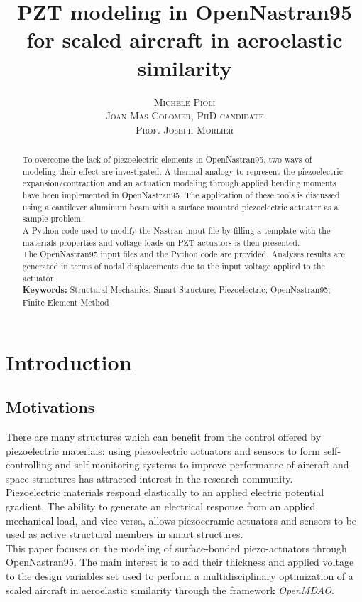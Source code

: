\documentclass[twocolumn,a4paper,10pt,english]{article}
\title{\textbf{\sc PZT modeling in OpenNastran95 for scaled aircraft in aeroelastic similarity\vspace{-0.5cm}}}
\author{
	\textsc{Michele Pioli}\vspace{-0.5cm}\\
	\textsc{Joan Mas Colomer, PhD candidate}\vspace{-0.5cm}\\
	\textsc{Prof. Joseph Morlier}
}
\date{}
\begin{document}
\thispagestyle{plain}

\maketitle


\begin{abstract}
    To overcome the lack of piezoelectric elements in OpenNastran95, two ways of modeling their effect are investigated. A thermal analogy to represent the piezoelectric expansion/contraction and an actuation modeling through applied bending moments have been implemented in OpenNastran95. The application of these tools is discussed using a cantilever aluminum beam with a surface mounted piezoelectric actuator as a sample problem.\\
	A Python code used to modify the Nastran input file by filling a template with the materials properties and voltage loads on PZT actuators is then presented.\\
	The OpenNastran95 input files and the Python code are provided.
	Analyses results are generated in terms of nodal displacements due to the input voltage applied to the actuator.\\
    
    \textbf{Keywords: } Structural Mechanics; Smart Structure; Piezoelectric; OpenNastran95; Finite Element Method 
\end{abstract}

\section{Introduction}
	        
    \subsection{Motivations}
    There are many structures which can benefit from the control offered by piezoelectric materials: using piezoelectric actuators and sensors to form self-controlling and self-monitoring systems to improve performance of aircraft and space structures has attracted interest in the research community.\\
     Piezoelectric materials respond elastically to an applied electric potential gradient. The ability to generate an electrical response from an applied mechanical load, and vice versa, allows piezoceramic actuators and sensors to be used as active structural members in smart structures. \\
     This paper focuses on the modeling of surface-bonded piezo-actuators through OpenNastran95. The main interest is to add their thickness and applied voltage to the design variables set used to perform a multidisciplinary optimization of a scaled aircraft in aeroelastic similarity through the framework \textit{OpenMDAO}.
    
\end{document}
